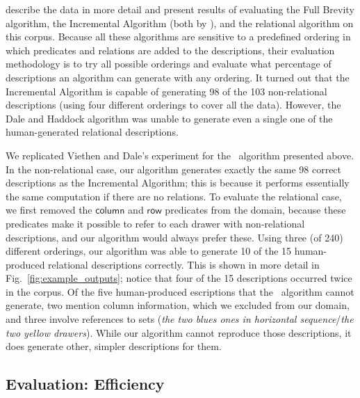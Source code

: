  describe the data in
more detail and present results of evaluating the Full Brevity
algorithm, the Incremental Algorithm (both by ), and
the relational algorithm \cite{dale91:_gener_refer_expres_invol_relat}
on this corpus.  Because all these algorithms are sensitive to a
predefined ordering in which predicates and relations are added to the
descriptions, their evaluation methodology is to try all possible
orderings and evaluate what percentage of descriptions an algorithm
can generate with any ordering.  It turned out that the Incremental
Algorithm is capable of generating 98 of the 103 non-relational
descriptions (using four different orderings to cover all the data).
However, the Dale and Haddock algorithm was unable to generate even a
single one of the human-generated relational descriptions.



We replicated Viethen and Dale's experiment for the \el\ algorithm
presented above.  In the non-relational case, our algorithm generates
exactly the same 98 correct descriptions as the Incremental Algorithm;
this is because it performs essentially the same computation if there
are no relations.  To evaluate the relational case, we first removed
the $\mathsf{column}$ and $\mathsf{row}$ predicates from the domain,
because these predicates make it possible to refer to each drawer with
non-relational descriptions, and our algorithm would always prefer
these.  Using three (of 240) different orderings, our algorithm was
able to generate 10 of the 15 human-produced relational descriptions
correctly.  This is shown in more detail in
Fig.~\ref{fig:example_outputs}; notice that four of the 15
descriptions occurred twice in the corpus.  Of the five human-produced
escriptions that the \el\ algorithm cannot generate, two mention
column information, which we excluded from our domain, and three
involve references to sets (\textit{the two blues ones in horizontal
  sequence}/\textit{the two yellow drawers}). While our algorithm
cannot reproduce those descriptions, it does generate other, simpler
descriptions for them.








\subsection{Evaluation: Efficiency}

